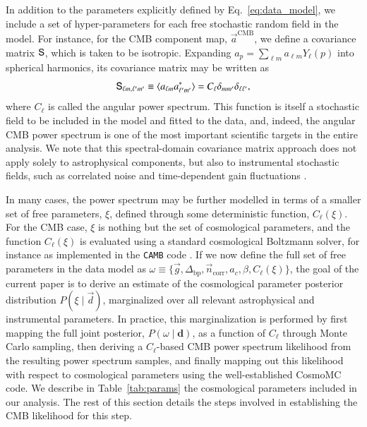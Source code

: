 \documentclass[twocolumn]{aa}
\renewcommand{\d}[0]{\vec{d}}
\newcommand{\n}[0]{\vec{n}}
\renewcommand{\a}[0]{\vec{a}}
\newcommand{\g}[0]{\vec{g}}
\renewcommand{\S}[0]{\tens{S}}
\begin{document}
In addition to the parameters explicitly defined by
Eq.~\eqref{eq:data_model}, we include a set of hyper-parameters for each
free stochastic random field in the model. For instance, for the CMB
component map, $\a^{\mathrm{CMB}}$, we define a covariance
matrix $\S$, which is taken to be isotropic. Expanding
$a_p=\sum_{\ell m} a_{\ell m}Y_\ell(p)$ into spherical harmonics,
its covariance matrix may be written as
\begin{equation}
  \label{eq:cov_harm}
  \S_{\ell m,\ell'm'}\equiv\langle a_{\ell m}a^{*}_{\ell'm'}\rangle=C_{\ell}
  \delta_{mm'}\delta_{\ell\ell'},
\end{equation}
where $C_\ell$ is called the angular power spectrum. This function
is itself a stochastic field to be included in the model and fitted to
the data, and, indeed, the angular CMB power spectrum is one of the
most important scientific targets in the entire analysis. We note that
this spectral-domain covariance matrix approach does not apply solely to
astrophysical components, but also to instrumental stochastic fields,
such as correlated noise \citep{bp06} and time-dependent gain fluctuations \citep{bp07}.

In many cases, the power spectrum may be further modelled in terms of
a smaller set of free parameters, $\xi$, defined through some
deterministic function, $C_{\ell}(\xi)$. For the CMB case, $\xi$ is
nothing but the set of cosmological parameters, and the function $C_{\ell}(\xi)$ is
evaluated using a standard cosmological Boltzmann solver, for instance as implemented
in the \texttt{CAMB} code \citep{Lewis:1999bs}. If we now define the
full set of free parameters in the data model as $\omega \equiv
\lbrace\g,\Delta_{\mathrm{bp}},\n_{\mathrm{corr}},a_c,\beta,
C_{\ell}(\xi)\rbrace$, the goal of the current paper is to derive an
estimate of the cosmological parameter posterior distribution
$P(\xi\mid\d)$, marginalized over all relevant astrophysical and
instrumental parameters. In practice, this marginalization is
performed by first mapping the full joint posterior, $P(\omega
\mid\mathbf{d})$, as a function of $C_{\ell}$ through Monte Carlo
sampling, then deriving a $C_{\ell}$-based CMB power spectrum likelihood from
the resulting power spectrum samples, and finally mapping out this
likelihood with respect to cosmological parameters using the
well-established CosmoMC \citep{cosmomc} code. We describe in
Table~\ref{tab:params} the cosmological parameters included in our analysis. 
The rest of this section details the steps involved in establishing 
the CMB likelihood for this step.
\end{document}
